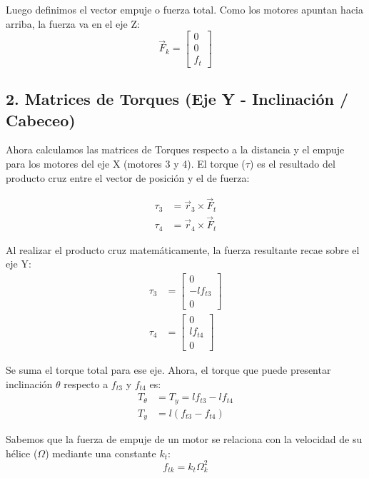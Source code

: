 \documentclass[11pt,a4paper]{article}
\begin{document}
Luego definimos el vector empuje o fuerza total. Como los motores apuntan hacia arriba, la fuerza va en el eje Z:
\begin{equation*}
\vec{F}_{k} = \begin{bmatrix} 0 \\ 0 \\ f_{t} \end{bmatrix}
\end{equation*}

\subsection*{2. Matrices de Torques (Eje Y - Inclinación / Cabeceo)}

Ahora calculamos las matrices de Torques respecto a la distancia y el empuje para los motores del eje X (motores 3 y 4). El torque ($\tau$) es el resultado del producto cruz entre el vector de posición y el de fuerza:

\begin{align*}
\tau_{3} &= \vec{r}_{3} \times \vec{F}_{t} \\
\tau_{4} &= \vec{r}_{4} \times \vec{F}_{t}
\end{align*}

Al realizar el producto cruz matemáticamente, la fuerza resultante recae sobre el eje Y:
\begin{align*}
\tau_{3} &= \begin{bmatrix} 0 \\ -l f_{t3} \\ 0 \end{bmatrix} \\
\tau_{4} &= \begin{bmatrix} 0 \\ l f_{t4} \\ 0 \end{bmatrix}
\end{align*}

Se suma el torque total para ese eje. Ahora, el torque que puede presentar inclinación $\theta$ respecto a $f_{t3}$ y $f_{t4}$ es:
\begin{align*}
T_{\theta} &= T_{y} = l f_{t3} - l f_{t4} \\
T_{y} &= l (f_{t3} - f_{t4})
\end{align*}

Sabemos que la fuerza de empuje de un motor se relaciona con la velocidad de su hélice ($\Omega$) mediante una constante $k_t$:
\begin{equation*}
f_{tk} = k_{t} \Omega_{k}^{2}
\end{equation*}
\end{document}
